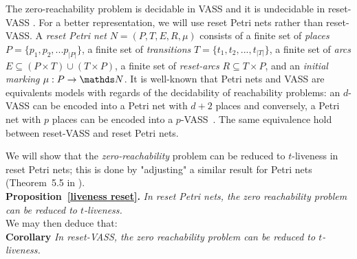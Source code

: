\documentclass[runningheads]{llncs}
\begin{document}
The zero-reachability problem is decidable in VASS and it is undecidable in reset-VASS \cite{araki1976PN}.
For a better representation, we will use reset Petri nets \cite{dufourd1998reset} rather than reset-VASS. 
A \emph{reset Petri net} $N = (P, T, E, R, \mu)$ consists of a finite set of {\em places} $P = \{p_1, p_2, ... p_{|P|}\}$, a finite set of {\em transitions} $T = \{t_1, t_2, ..., t_{|T|} \}$, a finite set of {\em arcs} $E \subseteq (P \times T) \cup (T \times P)$, a finite set of
{\em reset-arcs} $R \subseteq T \times P$, and an {\em initial marking} $\mu : P \to \N$.
It is well-known that Petri nets and VASS are equivalents models with regards of the decidability of reachability problems: an $d$-VASS can be encoded into a Petri net with $d+2$ places and conversely, a Petri net with $p$ places can be encoded into a $p$-VASS~\cite{DBLP:journals/siglog/Schmitz16}. The same equivalence hold between reset-VASS and reset Petri nets.


We will show that the {\em zero-reachability} problem can be reduced to {\sc $t$-liveness} in reset Petri nets; this is done by "adjusting" a similar result for Petri nets (Theorem~5.5 in  \cite{peterson1981petri}).\\



\noindent
\textbf{Proposition~\ref{liveness reset}.}
{\em In reset Petri nets, the zero reachability problem can be reduced to {\sc $t$-liveness}.}\\

We may then deduce that:\\

\noindent
\textbf{Corollary}
{\em In reset-VASS, the zero reachability problem can be reduced to {\sc $t$-liveness}.}
\end{document}
